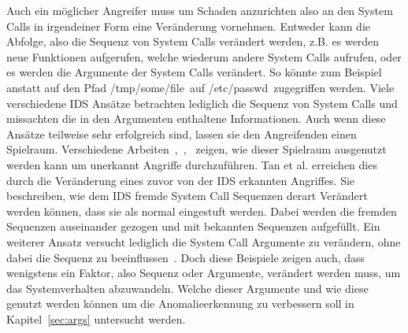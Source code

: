         Auch ein möglicher Angreifer muss um Schaden anzurichten also an den System Calls in irgendeiner Form eine Veränderung vornehmen.
        Entweder kann die Abfolge, also die Sequenz von System Calls verändert werden, z.B. es werden neue Funktionen aufgerufen, welche wiederum andere System Calls aufrufen,
        oder es werden die Argumente der System Calls verändert.
        So könnte zum Beispiel anstatt auf den Pfad \glqq /tmp/some/file\grqq \ auf \glqq /etc/passwd\grqq \ zugegriffen werden. 
        Viele verschiedene IDS Ansätze betrachten lediglich die Sequenz von System Calls und missachten die in den Argumenten enthaltene Informationen.
        Auch wenn diese Ansätze teilweise sehr erfolgreich sind, lassen sie den Angreifenden einen Spielraum.
        Verschiedene Arbeiten~\cite{Syscallseqexploit1},~\cite{Syscallseqexploit2},~\cite{Syscallseqexploit3} zeigen, wie dieser Spielraum ausgenutzt werden kann um unerkannt Angriffe durchzuführen. 
        Tan et al. \cite{Syscallseqexploit3} erreichen dies durch die Veränderung eines zuvor von der IDS erkannten Angriffes.
        Sie beschreiben, wie dem IDS fremde System Call Sequenzen derart Verändert werden können, dass sie als normal eingestuft werden.
        Dabei werden die fremden Sequenzen auseinander gezogen und mit bekannten Sequenzen aufgefüllt. 
        Ein weiterer Ansatz versucht lediglich die System Call Argumente zu verändern, ohne dabei die Sequenz zu beeinflussen~\cite{Syscallseqexploit1}.
        Doch diese Beispiele zeigen auch, dass wenigstens ein Faktor, also Sequenz oder Argumente, verändert werden muss, um das Systemverhalten abzuwandeln.
        Welche dieser Argumente und wie diese genutzt werden können um die Anomalieerkennung zu verbessern soll in Kapitel~\ref{sec:args} untersucht werden.

        
